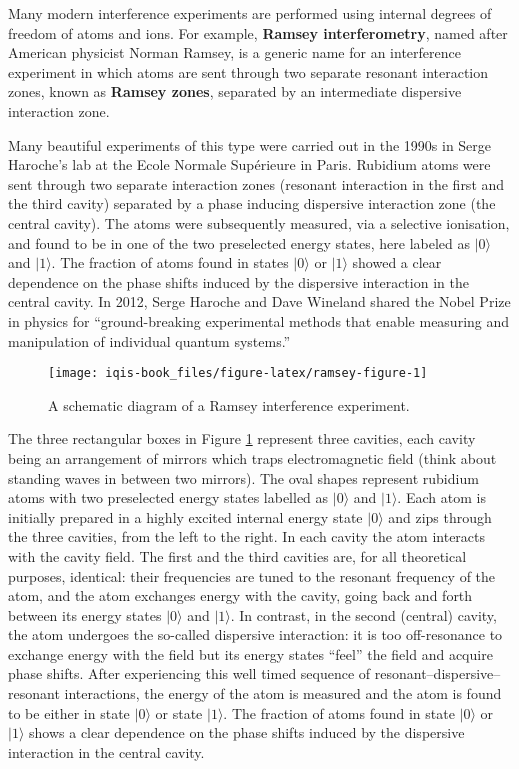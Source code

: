 \documentclass[fleqn]{article}
\begin{document}
Many modern interference experiments are performed using internal degrees of freedom of atoms and ions.
For example, \textbf{Ramsey interferometry}, named after American physicist Norman Ramsey, is a generic name for an interference experiment in which atoms are sent through two separate resonant interaction zones, known as \textbf{Ramsey zones}, separated by an intermediate dispersive interaction zone.

Many beautiful experiments of this type were carried out in the 1990s in Serge Haroche's lab at the Ecole Normale Supérieure in Paris.
Rubidium atoms were sent through two separate interaction zones (resonant interaction in the first and the third cavity) separated by a phase inducing dispersive interaction zone (the central cavity).
The atoms were subsequently measured, via a selective ionisation, and found to be in one of the two preselected energy states, here labeled as \(|0\rangle\) and \(|1\rangle\).
The fraction of atoms found in states \(|0\rangle\) or \(|1\rangle\) showed a clear dependence on the phase shifts induced by the dispersive interaction in the central cavity.
In 2012, Serge Haroche and Dave Wineland shared the Nobel Prize in physics for ``ground-breaking experimental methods that enable measuring and manipulation of individual quantum systems.''



\begin{figure}[H]

{\centering \texttt{[image: iqis-book\_files/figure-latex/ramsey-figure-1]} 

}

\caption{A schematic diagram of a Ramsey interference experiment.}\label{fig:ramsey-figure}
\end{figure}

The three rectangular boxes in Figure \ref{fig:ramsey-figure} represent three cavities, each cavity being an arrangement of mirrors which traps electromagnetic field (think about standing waves in between two mirrors).
The oval shapes represent rubidium atoms with two preselected energy states labelled as \(|0\rangle\) and \(|1\rangle\).
Each atom is initially prepared in a highly excited internal energy state \(|0\rangle\) and zips through the three cavities, from the left to the right.
In each cavity the atom interacts with the cavity field.
The first and the third cavities are, for all theoretical purposes, identical: their frequencies are tuned to the resonant frequency of the atom, and the atom exchanges energy with the cavity, going back and forth between its energy states \(|0\rangle\) and \(|1\rangle\).
In contrast, in the second (central) cavity, the atom undergoes the so-called dispersive interaction: it is too off-resonance to exchange energy with the field but its energy states ``feel'' the field and acquire phase shifts.
After experiencing this well timed sequence of resonant--dispersive--resonant interactions, the energy of the atom is measured and the atom is found to be either in state \(|0\rangle\) or state \(|1\rangle\).
The fraction of atoms found in state \(|0\rangle\) or \(|1\rangle\) shows a clear dependence on the phase shifts induced by the dispersive interaction in the central cavity.
\end{document}
